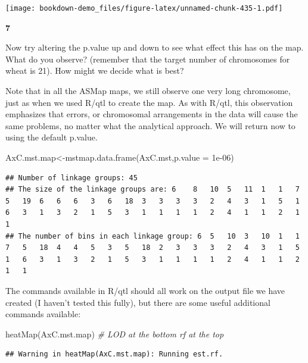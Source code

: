 \documentclass[
]{book}
\makeatletter
\newenvironment{Shaded}{\begin{snugshade}}{\end{snugshade}}
\newcommand{\AttributeTok}[1]{\textcolor[rgb]{0.77,0.63,0.00}{#1}}
\newcommand{\CommentTok}[1]{\textcolor[rgb]{0.56,0.35,0.01}{\textit{#1}}}
\newcommand{\FloatTok}[1]{\textcolor[rgb]{0.00,0.00,0.81}{#1}}
\newcommand{\FunctionTok}[1]{\textcolor[rgb]{0.00,0.00,0.00}{#1}}
\newcommand{\NormalTok}[1]{#1}
\newcommand{\OtherTok}[1]{\textcolor[rgb]{0.56,0.35,0.01}{#1}}
\newenvironment{kframe}{%
\medskip{}
\setlength{\fboxsep}{.8em}
 \def\at@end@of@kframe{}%
 \ifinner\ifhmode%
  \def\at@end@of@kframe{\end{minipage}}%
  \begin{minipage}{\columnwidth}%
 \fi\fi%
 \def\FrameCommand##1{\hskip\@totalleftmargin \hskip-\fboxsep
 \colorbox{shadecolor}{##1}\hskip-\fboxsep
     \hskip-\linewidth \hskip-\@totalleftmargin \hskip\columnwidth}%
 \MakeFramed {\advance\hsize-\width
   \@totalleftmargin\z@ \linewidth\hsize
   \@setminipage}}%
 {\par\unskip\endMakeFramed%
 \at@end@of@kframe}
\newenvironment{rmdblock}[1]
  {
  \begin{itemize}
  \renewcommand{\labelitemi}{
    \raisebox{-.7\height}[0pt][0pt]{
      {\setkeys{Gin}{width=3em,keepaspectratio}\texttt{[image: images/\#1]}}
    }
  }
  \setlength{\fboxsep}{1em}
  \begin{kframe}
  \item
  }
  {
  \end{kframe}
  \end{itemize}
  }
\newenvironment{rmdquiz}
  {\begin{rmdblock}{quiz}}
  {\end{rmdblock}}
\makeatother
\begin{document}
\texttt{[image: bookdown-demo\_files/figure-latex/unnamed-chunk-435-1.pdf]}

\begin{rmdquiz}
\textbf{7}

Now try altering the p.value up and down to see what effect this has on the map. What do you observe? (remember that the target number of chromosomes for wheat is 21). How might we decide what is best?
\end{rmdquiz}

Note that in all the ASMap maps, we still observe one very long chromosome, just as when we used R/qtl to create the map. As with R/qtl, this observation emphasizes that errors, or chromosomal arrangements in the data will cause the same problems, no matter what the analytical approach. We will return now to using the default p.value.

\begin{Shaded}
\begin{Highlighting}[]
\NormalTok{AxC.mst.map}\OtherTok{\textless{}{-}}\FunctionTok{mstmap.data.frame}\NormalTok{(AxC.mst,}\AttributeTok{p.value =} \FloatTok{1e{-}06}\NormalTok{) }
\end{Highlighting}
\end{Shaded}

\begin{verbatim}
## Number of linkage groups: 45
## The size of the linkage groups are: 6    8   10  5   11  1   1   7   5   19  6   6   6   3   6   18  3   3   3   3   2   4   3   1   5   1   6   3   1   3   2   1   5   3   1   1   1   1   2   4   1   1   2   1   1   
## The number of bins in each linkage group: 6  5   10  3   10  1   1   7   5   18  4   4   5   3   5   18  2   3   3   3   2   4   3   1   5   1   6   3   1   3   2   1   5   3   1   1   1   1   2   4   1   1   2   1   1   
\end{verbatim}

The commands available in R/qtl should all work on the output file we have created (I haven't tested this fully), but there are some useful additional commands available:

\begin{Shaded}
\begin{Highlighting}[]
\FunctionTok{heatMap}\NormalTok{(AxC.mst.map) }\CommentTok{\# LOD at the bottom rf at the top }
\end{Highlighting}
\end{Shaded}

\begin{verbatim}
## Warning in heatMap(AxC.mst.map): Running est.rf.
\end{verbatim}
\end{document}
